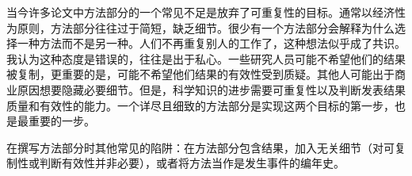 当今许多论文中方法部分的一个常见不足是放弃了可重复性的目标。通常以经济性为原则，方法部分往往过于简短，缺乏细节。很少有一个方法部分会解释为什么选择一种方法而不是另一种。人们不再重复别人的工作了，这种想法似乎成了共识。我认为这种态度是错误的，往往是出于私心。一些研究人员可能不希望他们的结果被复制，更重要的是，可能不希望他们结果的有效性受到质疑。其他人可能出于商业原因想要隐藏必要细节。但是，科学知识的进步需要可重复性以及判断发表结果质量和有效性的能力。一个详尽且细致的方法部分是实现这两个目标的第一步，也是最重要的一步。

在撰写方法部分时其他常见的陷阱：在方法部分包含结果，加入无关细节（对可复制性或判断有效性并非必要），或者将方法当作是发生事件的编年史。

